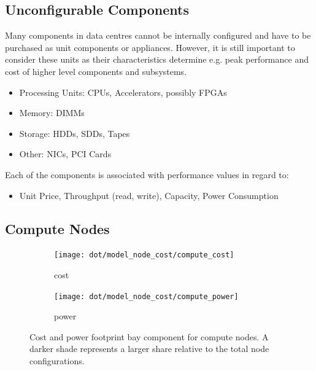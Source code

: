 \documentclass{../../template/esiwace-report}
\begin{document}
\subsection{Unconfigurable Components}
\label{sec:modeling/components/unconfigurable}

Many components in data centres cannot be internally configured and have to be purchased as unit components or appliances. However, it is still important to consider these units as their characteristics determine e.g. peak performance and cost of higher level components and subsystems.

\begin{itemize}
	\item Processing Units: CPUs, Accelerators, possibly FPGAs
	\item Memory: DIMMs
	\item Storage: HDDs, SDDs, Tapes
	\item Other: NICs, PCI Cards
\end{itemize}

Each of the components is associated with performance values in regard to:

\begin{itemize}
	\item Unit Price, Throughput (read, write), Capacity, Power Consumption
\end{itemize}


\subsection{Compute Nodes}
\label{sec:modeling/components/computenodes}



\begin{figure} [htb]
	\centering
	\begin{subfigure}[t]{0.49\textwidth}
		\centering
		\texttt{[image: dot/model\_node\_cost/compute\_cost]}
		\caption{cost}
	\end{subfigure}
	\begin{subfigure}[t]{0.49\textwidth}
		\centering
		\texttt{[image: dot/model\_node\_cost/compute\_power]}
		\caption{power}
	\end{subfigure}
	\caption{Cost and power footprint bay component for compute nodes. A darker shade represents a larger share relative to the total node configurations.}
	\label{fig:components-compute-node}
\end{figure}
\end{document}
